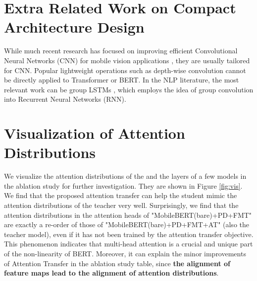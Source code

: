 \documentclass[11pt,a4paper]{article}
\begin{document}
\begin{figure*}[t]
	\centering
	\caption{The visualization of the attention distributions in some attention heads of the IB-BERT teacher and different MobileBERT models.}
	\label{fig:vis}
\end{figure*}

\section{Extra Related Work on Compact Architecture Design}
While much recent research has focused on improving efficient Convolutional Neural Networks (CNN) for mobile vision applications
\citep{iandola2016squeezenet,howard2017mobilenets,zhang2017interleaved,zhang2018shufflenet,sandler2018mobilenetv2,tan2019mnasnet,howard2019searching}, they are usually tailored for CNN.
Popular lightweight operations such as depth-wise convolution \citep{howard2017mobilenets} cannot be directly applied to Transformer or BERT. In the NLP literature, the most relevant work  can be group LSTMs \citep{kuchaiev2017factorization,gao2018efficient}, which employs the idea of group convolution \citep{zhang2017interleaved,zhang2018shufflenet} into Recurrent Neural Networks (RNN).




\section{Visualization of Attention Distributions}

We visualize the attention distributions of the  and the  layers of a few models in the ablation study for further investigation. They are shown in Figure \ref{fig:vis}. We find that the proposed attention transfer can help the student mimic the attention distributions of the teacher very well. Surprisingly, we find that the attention distributions in the attention heads of "MobileBERT(bare)+PD+FMT" are exactly a re-order of those of "MobileBERT(bare)+PD+FMT+AT" (also the teacher model), even if it has not been trained by the attention transfer objective. This phenomenon indicates that multi-head attention is a crucial and unique part of the non-linearity of BERT. Moreover, it can explain the minor improvements of Attention Transfer in the ablation study table, since \textbf{the alignment of feature maps lead to the alignment of attention distributions}.
\end{document}
